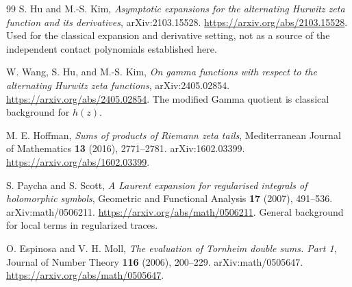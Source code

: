 \documentclass[11pt,letterpaper]{article}
\numberwithin{equation}{section}
\theoremstyle{definition}
\theoremstyle{remark}
\begin{document}
\begin{thebibliography}{99}
S. Hu and M.-S. Kim,
\emph{Asymptotic expansions for the alternating Hurwitz zeta function
and its derivatives}, arXiv:2103.15528.
\url{https://arxiv.org/abs/2103.15528}.
Used for the classical expansion and derivative setting, not as a source
of the independent contact polynomials established here.

W. Wang, S. Hu, and M.-S. Kim,
\emph{On gamma functions with respect to the alternating Hurwitz zeta
functions}, arXiv:2405.02854.
\url{https://arxiv.org/abs/2405.02854}.
The modified Gamma quotient is classical background for \(h(z)\).

M. E. Hoffman,
\emph{Sums of products of Riemann zeta tails},
Mediterranean Journal of Mathematics \textbf{13} (2016), 2771--2781.
arXiv:1602.03399.
\url{https://arxiv.org/abs/1602.03399}.

S. Paycha and S. Scott,
\emph{A Laurent expansion for regularised integrals of holomorphic symbols},
Geometric and Functional Analysis \textbf{17} (2007), 491--536.
arXiv:math/0506211.
\url{https://arxiv.org/abs/math/0506211}.
General background for local terms in regularized traces.

O. Espinosa and V. H. Moll,
\emph{The evaluation of Tornheim double sums. Part 1},
Journal of Number Theory \textbf{116} (2006), 200--229.
arXiv:math/0505647.
\url{https://arxiv.org/abs/math/0505647}.
\end{thebibliography}

\end{document}
